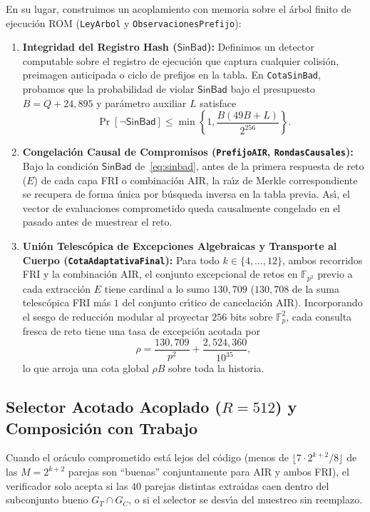\documentclass[conference]{IEEEtran}
\theoremstyle{definition}
\begin{document}
En su lugar, construimos un acoplamiento con memoria sobre el \'{a}rbol finito de ejecuci\'{o}n ROM (\texttt{LeyArbol} y \texttt{ObservacionesPrefijo}):
\begin{enumerate}
    \item \textbf{Integridad del Registro Hash ($\mathsf{SinBad}$):} Definimos un detector computable sobre el registro de ejecuci\'{o}n que captura cualquier colisi\'{o}n, preimagen anticipada o ciclo de prefijos en la tabla. En \texttt{CotaSinBad}, probamos que la probabilidad de violar $\mathsf{SinBad}$ bajo el presupuesto $B = Q + 24{,}895$ y par\'{a}metro auxiliar $L$ satisface
    \begin{equation}
    \label{eq:sinbad}
    \Pr[\lnot \mathsf{SinBad}] \le \min\left\{1, \frac{B(49B + L)}{2^{256}}\right\}.
    \end{equation}
    \item \textbf{Congelaci\'{o}n Causal de Compromisos (\texttt{PrefijoAIR}, \texttt{RondasCausales}):} Bajo la condici\'{o}n $\mathsf{SinBad}$ de~\eqref{eq:sinbad}, antes de la primera respuesta de reto ($E$) de cada capa FRI o combinaci\'{o}n AIR, la ra\'{\i}z de Merkle correspondiente se recupera de forma \'{u}nica por b\'{u}squeda inversa en la tabla previa. As\'{\i}, el vector de evaluaciones comprometido queda causalmente congelado en el pasado antes de muestrear el reto.
    \item \textbf{Uni\'{o}n Telesc\'{o}pica de Excepciones Algebraicas y Transporte al Cuerpo (\texttt{CotaAdaptativaFinal}):} Para todo $k \in \{4,\dots,12\}$, ambos recorridos FRI y la combinaci\'{o}n AIR, el conjunto excepcional de retos en $\mathbb{F}_{p^2}$ previo a cada extracci\'{o}n $E$ tiene cardinal a lo sumo $130{,}709$ ($130{,}708$ de la suma telesc\'{o}pica FRI m\'{a}s $1$ del conjunto cr\'{\i}tico de cancelaci\'{o}n AIR). Incorporando el sesgo de reducci\'{o}n modular al proyectar $256$ bits sobre $\mathbb{F}_p^2$, cada consulta fresca de reto tiene una tasa de excepci\'{o}n acotada por
    \begin{equation}
    \label{eq:rho}
    \rho = \frac{130{,}709}{p^2} + \frac{2{,}524{,}360}{10^{35}},
    \end{equation}
    lo que arroja una cota global $\rho B$ sobre toda la historia.
\end{enumerate}

\subsection{Selector Acotado Acoplado ($R = 512$) y Composici\'{o}n con Trabajo}
Cuando el or\'{a}culo comprometido est\'{a} lejos del c\'{o}digo (menos de $\lfloor 7 \cdot 2^{k+2} / 8 \rfloor$ de las $M = 2^{k+2}$ parejas son ``buenas'' conjuntamente para AIR y ambos FRI), el verificador solo acepta si las $40$ parejas distintas extra\'{\i}das caen dentro del subconjunto bueno $G_T \cap G_C$, o si el selector se desv\'{\i}a del muestreo sin reemplazo.
\end{document}
